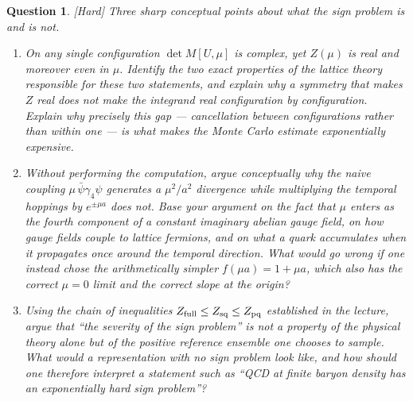 \documentclass[11pt]{article}
\newcommand{\diff}[1]{\textcolor{blue!60!black}{\footnotesize\textsf{[#1]}}\quad}
\newtheorem{question}{Question}
\begin{document}
\begin{question}
\diff{Hard} Three sharp conceptual points about what the sign problem is and is not.
\begin{enumerate}[label=(\roman*), leftmargin=*]
  \item On any single configuration $\det M[U,\mu]$ is complex, yet $Z(\mu)$ is real and moreover even in $\mu$. Identify the two exact properties of the lattice theory responsible for these two statements, and explain why a symmetry that makes $Z$ real does \emph{not} make the integrand real configuration by configuration. Explain why precisely this gap --- cancellation \emph{between} configurations rather than within one --- is what makes the Monte Carlo estimate exponentially expensive.
  \item Without performing the computation, argue conceptually why the naive coupling $\mu\,\bar\psi\gamma_4\psi$ generates a $\mu^2/a^2$ divergence while multiplying the temporal hoppings by $e^{\pm\mu a}$ does not. Base your argument on the fact that $\mu$ enters as the fourth component of a constant \emph{imaginary} abelian gauge field, on how gauge fields couple to lattice fermions, and on what a quark accumulates when it propagates once around the temporal direction. What would go wrong if one instead chose the arithmetically simpler $f(\mu a) = 1 + \mu a$, which also has the correct $\mu=0$ limit and the correct slope at the origin?
  \item Using the chain of inequalities $Z_{\rm full} \le Z_{\rm sq} \le Z_{\rm pq}$ established in the lecture, argue that ``the severity of the sign problem'' is not a property of the physical theory alone but of the positive reference ensemble one chooses to sample. What would a representation with no sign problem look like, and how should one therefore interpret a statement such as ``QCD at finite baryon density has an exponentially hard sign problem''?
\end{enumerate}
\end{question}
\end{document}
